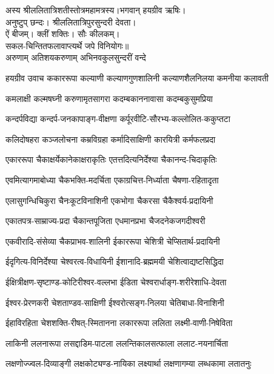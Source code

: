 
अस्य  श्रीललितात्रिशतीस्तोत्रमहामत्रस्य।भगवान्  हयग्रीव  ऋषिः। \\
अनुष्टुप्  छन्दः। श्रीललितात्रिपुरसुन्दरी  देवता।\\
ऐं  बीजम्।  क्लीं  शक्तिः।  सौः  कीलकम्।\\
सकल-चिन्तितफलावाप्त्यर्थे  जपे  विनियोगः॥\\

{अरुणाम्  अतिशयकरुणाम्  अभिनवकुलसुन्दरीं  वन्दे}

हयग्रीव  उवाच
\twolineshloka
{ककाररूपा कल्याणी कल्याणगुणशालिनी}
{कल्याणशैलनिलया कमनीया कलावती}

\twolineshloka
{कमलाक्षी कल्मषघ्नी करुणामृतसागरा}
{कदम्बकाननावासा कदम्बकुसुमप्रिया}

\twolineshloka
{कन्दर्पविद्या कन्दर्प-जनकापाङ्ग-वीक्षणा}
{कर्पूरवीटि-सौरभ्य-कल्लोलित-ककुप्तटा}

\twolineshloka
{कलिदोषहरा कञ्जलोचना कम्रविग्रहा}
{कर्मादिसाक्षिणी कारयित्री कर्मफलप्रदा}

\twolineshloka
{एकाररूपा चैकाक्षर्येकानेकाक्षराकृतिः}
{एतत्तदित्यनिर्देश्या चैकानन्द-चिदाकृतिः}

\twolineshloka
{एवमित्यागमाबोध्या चैकभक्ति-मदर्चिता}
{एकाग्रचित्त-निर्ध्याता चैषणा-रहितादृता}

\twolineshloka
{एलासुगन्धिचिकुरा चैनःकूटविनाशिनी}
{एकभोगा चैकरसा चैकैश्वर्य-प्रदायिनी}

\twolineshloka
{एकातपत्र-साम्राज्य-प्रदा चैकान्तपूजिता}
{एधमानप्रभा चैजदनेकजगदीश्वरी}

\twolineshloka
{एकवीरादि-संसेव्या चैकप्राभव-शालिनी}
{ईकाररूपा चेशित्री चेप्सितार्थ-प्रदायिनी}

\twolineshloka
{ईदृगित्य-विनिर्देश्या चेश्वरत्व-विधायिनी}
{ईशानादि-ब्रह्ममयी चेशित्वाद्यष्टसिद्धिदा}

\twolineshloka
{ईक्षित्रीक्षण-सृष्टाण्ड-कोटिरीश्वर-वल्लभा}
{ईडिता चेश्वरार्धाङ्ग-शरीरेशाधि-देवता}

\twolineshloka
{ईश्वर-प्रेरणकरी चेशताण्डव-साक्षिणी}
{ईश्वरोत्सङ्ग-निलया चेतिबाधा-विनाशिनी}

\twolineshloka
{ईहाविरहिता चेशशक्ति-रीषत्‌-स्मितानना}
{लकाररूपा ललिता लक्ष्मी-वाणी-निषेविता}

\twolineshloka
{लाकिनी ललनारूपा लसद्दाडिम-पाटला}
{ललन्तिकालसत्फाला ललाट-नयनार्चिता}

\twolineshloka
{लक्षणोज्ज्वल-दिव्याङ्गी लक्षकोट्यण्ड-नायिका}
{लक्ष्यार्था लक्षणागम्या लब्धकामा लतातनुः}

